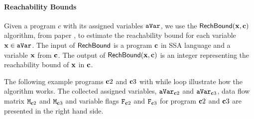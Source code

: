 \documentclass[a4paper,11pt]{article}
\begin{document}
\paragraph{Reachability Bounds}
Given a program $c$ with its assigned variables $\mathtt{aVar}$,
we use the $\mathsf{RechBound}({\boldsymbol{\mathbf{x}}}, {\boldsymbol{\mathbf{c}}})$ algorithm, from paper \cite{10.1145/1806596.1806630}, to estimate the reachability bound for each variable ${\boldsymbol{\mathbf{x}}} \in \mathtt{aVar}$. 
The input of $\mathsf{RechBound}$ is a program ${\boldsymbol{\mathbf{c}}}$ in SSA language and a variable ${\boldsymbol{\mathbf{x}}} $ from ${\boldsymbol{\mathbf{c}}}$.
The output of $\mathsf{RechBound}({\boldsymbol{\mathbf{x}}}, {\boldsymbol{\mathbf{c}}})$ is an integer representing the reachability bound of ${\boldsymbol{\mathbf{x}}}$ in ${\boldsymbol{\mathbf{c}}}$.
%

%
The following example programs ${\boldsymbol{\mathbf{c}}}2$ and ${\boldsymbol{\mathbf{c}}}3$ with while loop illustrate how the algorithm works.
The collected assigned variables, $\mathtt{aVar}_{{\boldsymbol{\mathbf{c}}}2}$ and $\mathtt{aVar}_{{\boldsymbol{\mathbf{c}}}3}$,
data flow matrix $\mathtt{M}_{{\boldsymbol{\mathbf{c}}}2}$ and  $\mathtt{M}_{{\boldsymbol{\mathbf{c}}}3}$
and variable flags $\mathtt{F}_{{\boldsymbol{\mathbf{c}}}2}$ and $\mathtt{F}_{{\boldsymbol{\mathbf{c}}}3}$
for program ${\boldsymbol{\mathbf{c}}}2$ and ${\boldsymbol{\mathbf{c}}}3$
are presented in the right hand side.
%
\end{document}
